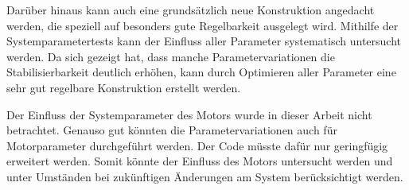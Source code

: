 Darüber hinaus kann auch eine grundsätzlich neue Konstruktion angedacht werden, die speziell auf besonders gute Regelbarkeit ausgelegt wird.
Mithilfe der Systemparametertests kann der Einfluss aller Parameter systematisch untersucht werden.
Da sich gezeigt hat, dass manche Parametervariationen die Stabilisierbarkeit deutlich erhöhen, kann durch Optimieren aller Parameter eine sehr gut regelbare Konstruktion erstellt werden.

Der Einfluss der Systemparameter des Motors wurde in dieser Arbeit nicht betrachtet.
Genauso gut könnten die Parametervariationen auch für Motorparameter durchgeführt werden.
Der Code müsste dafür nur geringfügig erweitert werden.
Somit könnte der Einfluss des Motors untersucht werden und unter Umständen bei zukünftigen Änderungen am System berücksichtigt werden.